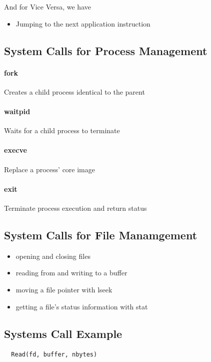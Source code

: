 \documentclass{article}
\begin{document}
And for Vice Versa, we have
\begin{itemize}
  \item Jumping to the next application instruction
\end{itemize}

\subsection{System Calls for Process Management}

\paragraph{fork} Creates a child process identical to the parent
\paragraph{waitpid} Waits for a child process to terminate
\paragraph{execve} Replace a process' core image
\paragraph{exit} Terminate process execution and return status

\subsection{System Calls for File Manamgement}

\begin{itemize}
  \item opening and closing files
  \item reading from and writing to a buffer
  \item moving a file pointer with lseek
  \item getting a file's status information with stat
\end{itemize}

\subsection{Systems Call Example}

\begin{lstlisting}
  Read(fd, buffer, nbytes)
\end{lstlisting}
\end{document}
